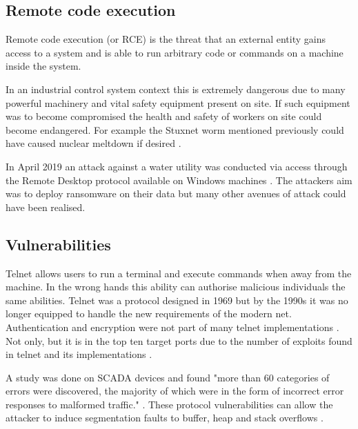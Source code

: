 \documentclass{article}
\begin{document}
\begin{multicols}{2}

    \section{Remote code execution}
    Remote code execution (or RCE)
    is the threat that an external entity gains access to a
    system and is able to run arbitrary code or commands on a machine inside the
    system.

    In an industrial control system context this is extremely dangerous due to many
    powerful machinery and vital safety equipment present on site. 
    If such equipment
    was to become compromised the health and safety of workers on site could
    become endangered. For example the Stuxnet worm mentioned previously
    could have caused nuclear
    meltdown if desired \cite{stuxnet}.

    In April 2019 an attack against a water utility was conducted via access through
    the Remote Desktop protocol available on Windows machines \cite{kapersky}.
    The attackers aim was to deploy ransomware on their data but many other avenues
    of attack could have been realised.

    \subsection{Vulnerabilities}
    Telnet allows users to run a terminal and execute commands when away from the
    machine. In the wrong hands this ability can authorise malicious individuals the
    same abilities.
    Telnet was a protocol designed in 1969 but by the 1990s 
    it was no longer equipped to
    handle the new requirements of the modern net.
    Authentication and encryption were not
    part of many telnet implementations \cite{telnet}. Not only, 
    but it is in the
    top ten target ports due to the number of exploits found in telnet and its
    implementations \cite{telnet}.

    A study was done on SCADA devices and found "more than 60 categories of errors
    were discovered, the majority of which were in the form of incorrect error
    responses to malformed traffic." \cite{shaky}. These protocol vulnerabilities
    can allow the attacker to induce segmentation
    faults to buffer, heap and stack overflows \cite{shaky} \cite{scada}.


\end{multicols}
\end{document}
